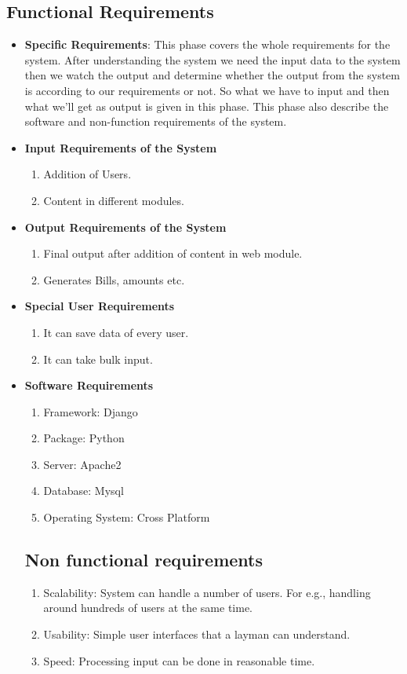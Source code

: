 \subsection{Functional Requirements}
\begin{itemize}
\item {\bf Specific Requirements}: This phase covers the whole requirements 
for the system. After understanding the system we need the input data 
to the system then we watch the output and determine whether the output 
from the system is according to our requirements or not. So what we have 
to input and then what we'll get as output is given in this phase. This 
phase also describe the software and non-function requirements of the 
system.
\item {\bf Input Requirements of the System}
\begin{enumerate} 
\item Addition of Users.
\item Content in different modules.
\end{enumerate}
\vskip 0.5cm
\item {\bf Output Requirements of the System}
\begin{enumerate} 
\item Final output after addition of content in web module.
\item Generates Bills, amounts etc.
\end{enumerate}
\vskip 0.5cm
\item {\bf Special User Requirements}
\begin{enumerate} 
\item It can save data of every user.
\item It can take bulk input.
\end{enumerate}
\vskip 0.5cm
\item {\bf Software Requirements}
\begin{enumerate} 
\item Framework: Django
\item Package: Python
\item Server: Apache2
\item Database: Mysql 
\item Operating System: Cross Platform

\end{enumerate}
\vskip 0.5cm
\subsection{Non functional requirements}
\begin{enumerate} 
\item Scalability: System can handle a number of users. 
For e.g., handling around hundreds of users at the same time.
\item Usability: Simple user interfaces that a layman can understand.
\item Speed: Processing input can be done in reasonable time.
\end{enumerate}
\end{itemize}

